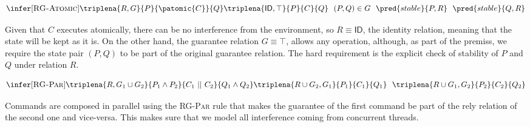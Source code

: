 \[
\infer[\textsc{RG-Atomic}]
{
	\triplena{R, G}{P}{\patomic{C}}{Q}
}
{
	\triplena{\mathsf{ID}, \top}{P}{C}{Q}
	\ \
	(P, Q) \in G
	\ \
	\pred{stable}{P, R}
	\ \
	\pred{stable}{Q, R}
}
\]

Given that $C$ executes atomically, there can be no interference from the environment, so $R \equiv \mathsf{ID}$, the identity relation, meaning that the state will be kept as it is. On the other hand, the guarantee relation $G \equiv \top$, allows any operation, although, as part of the premiss, we require the state pair $(P, Q)$ to be part of the original guarantee relation. The hard requirement is the explicit check of stability of $P$ and $Q$ under relation $R$.

\[
\infer[\textsc{RG-Par}]
{
	\triplena{R, G_1 \cup G_2}{P_1 \land P_2}{C_1\ ||\ C_2}{Q_1 \land Q_2}
}
{
	\triplena{R \cup G_2, G_1}{P_1}{C_1}{Q_1}
	\ \
	\triplena{R \cup G_1, G_2}{P_2}{C_2}{Q_2}
}
\]

Commands are composed in parallel using the \textsc{RG-Par} rule that makes the guarantee of the first command be part of the rely relation of the second one and vice-versa. This makes sure that we model all interference coming from concurrent threads.
